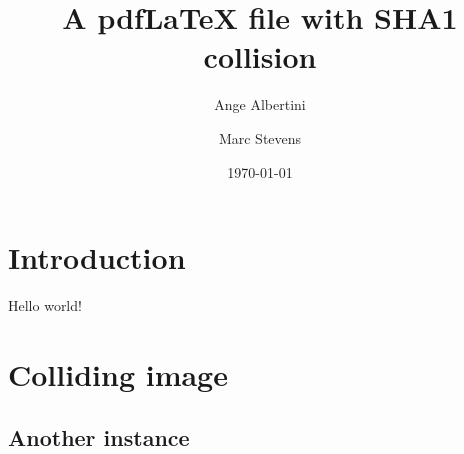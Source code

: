 \documentclass{article}
\title{A pdf\LaTeX{} file with SHA1 collision}
\author{Ange Albertini
	\and 
	Marc Stevens
	}
\date{\today}
\begin{document}
\maketitle

\section{Introduction}
Hello world!

\section{Colliding image}

\collided

\subsection{Another instance}

\collided
\end{document}
